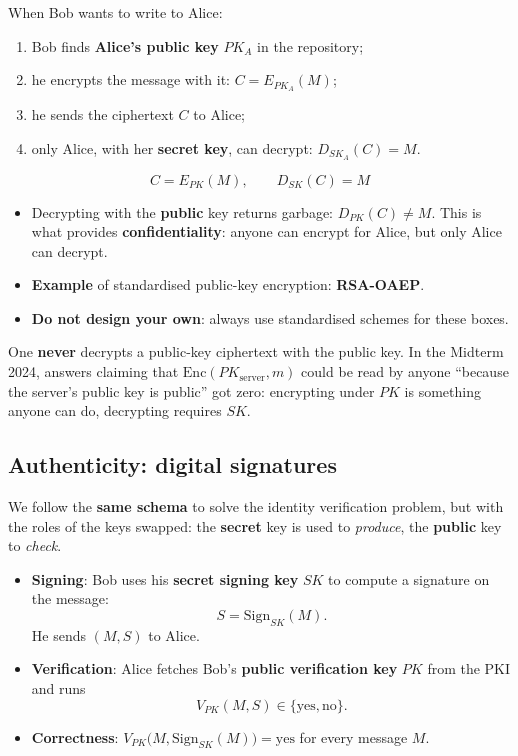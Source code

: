 When Bob wants to write to Alice:
\begin{enumerate}
    \item Bob finds \textbf{Alice's public key} $PK_A$ in the repository;
    \item he encrypts the message with it: $C = E_{PK_A}(M)$;
    \item he sends the ciphertext $C$ to Alice;
    \item only Alice, with her \textbf{secret key}, can decrypt: $D_{SK_A}(C) = M$.
\end{enumerate}

\[
\boxed{C = E_{PK}(M), \qquad D_{SK}(C) = M}
\]
\begin{itemize}
    \item Decrypting with the \textbf{public} key returns garbage: $D_{PK}(C) \neq M$. This is what provides \textbf{confidentiality}: anyone can encrypt for Alice, but only Alice can decrypt.
    \item \textbf{Example} of standardised public-key encryption: \textbf{RSA-OAEP}.
    \item \textbf{Do not design your own}: always use standardised schemes for these boxes.
\end{itemize}

\begin{remark}
One \textbf{never} decrypts a public-key ciphertext with the public key. In the Midterm 2024, answers claiming that $\mathrm{Enc}(PK_{\text{server}}, m)$ could be read by anyone ``because the server's public key is public'' got zero: encrypting under $PK$ is something anyone can do, decrypting requires $SK$.
\end{remark}

\subsection{Authenticity: digital signatures}

We follow the \textbf{same schema} to solve the identity verification problem, but with the roles of the keys swapped: the \textbf{secret} key is used to \emph{produce}, the \textbf{public} key to \emph{check}.

\begin{definition}
\begin{itemize}
    \item \textbf{Signing}: Bob uses his \textbf{secret signing key} $SK$ to compute a signature on the message:
    \[
    S = \mathrm{Sign}_{SK}(M).
    \]
    He sends $(M, S)$ to Alice.
    \item \textbf{Verification}: Alice fetches Bob's \textbf{public verification key} $PK$ from the PKI and runs
    \[
    V_{PK}(M, S) \in \{\text{yes}, \text{no}\}.
    \]
    \item \textbf{Correctness}: $V_{PK}\big(M, \mathrm{Sign}_{SK}(M)\big) = \text{yes}$ for every message $M$.
\end{itemize}
\end{definition}

